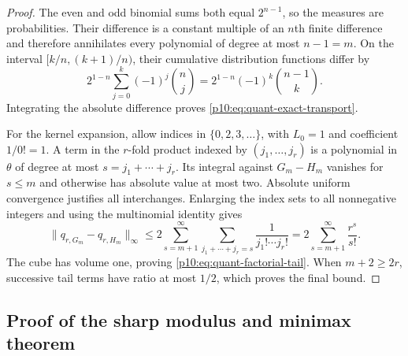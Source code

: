\documentclass[11pt,letterpaper]{article}
\theoremstyle{definition}
\theoremstyle{remark}
\newcommand{\1}{\mathbf 1}
\begin{document}
\begin{proof}
The even and odd binomial sums both equal $2^{n-1}$, so the measures
are probabilities.  Their difference is a constant multiple of an
$n$th finite difference and therefore annihilates every polynomial of
degree at most $n-1=m$.  On the interval $[k/n,(k+1)/n)$, their
cumulative distribution functions differ by
\[
 2^{1-n}\sum_{j=0}^k(-1)^j\binom nj
   =2^{1-n}(-1)^k\binom{n-1}{k}.
\]
Integrating the absolute difference proves
\eqref{p10:eq:quant-exact-transport}.

For the kernel expansion, allow indices in $\{0,2,3,\ldots\}$,
with $L_0=1$ and coefficient $1/0!=1$.  A term in the $r$-fold
product indexed by $(j_1,\ldots,j_r)$ is a polynomial in $\theta$
of degree at most $s=j_1+\cdots+j_r$.  Its integral against
$G_m-H_m$ vanishes for $s\le m$ and otherwise has absolute value
at most two.  Absolute uniform convergence justifies all
interchanges.  Enlarging the index sets to all nonnegative integers
and using the multinomial identity gives
\[
 \|q_{r,G_m}-q_{r,H_m}\|_\infty
 \le2\sum_{s=m+1}^{\infty}
       \sum_{j_1+\cdots+j_r=s}\frac1{j_1!\cdots j_r!}
 =2\sum_{s=m+1}^{\infty}\frac{r^s}{s!}.
\]
The cube has volume one, proving \eqref{p10:eq:quant-factorial-tail}.
When $m+2\ge2r$, successive tail terms have ratio at most $1/2$,
which proves the final bound.
\end{proof}

\subsection{Proof of the sharp modulus and minimax theorem}
\end{document}
